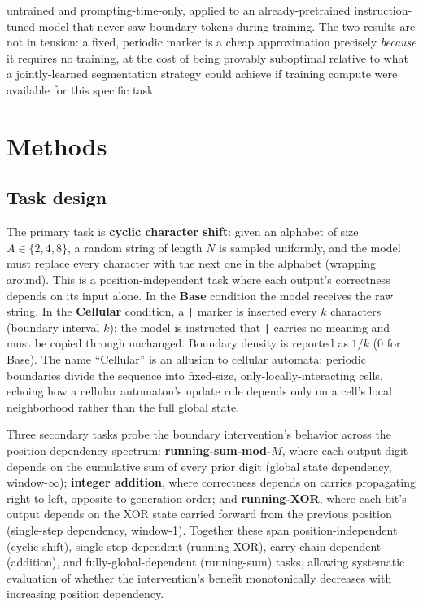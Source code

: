 \documentclass[11pt]{article}
\begin{document}
untrained and prompting-time-only, applied to an already-pretrained instruction-tuned model that never saw boundary tokens during training. The two results are not in tension: a fixed, periodic marker is a cheap approximation precisely \emph{because} it requires no training, at the cost of being provably suboptimal relative to what a jointly-learned segmentation strategy could achieve if training compute were available for this specific task.

\section{Methods}

\subsection{Task design}

The primary task is \textbf{cyclic character shift}: given an alphabet of size $A \in \{2, 4, 8\}$, a random string of length $N$ is sampled uniformly, and the model must replace every character with the next one in the alphabet (wrapping around). This is a position-independent task where each output's correctness depends on its input alone. In the \textbf{Base} condition the model receives the raw string. In the \textbf{Cellular} condition, a \texttt{|} marker is inserted every $k$ characters (boundary interval $k$); the model is instructed that \texttt{|} carries no meaning and must be copied through unchanged. Boundary density is reported as $1/k$ (0 for Base). The name ``Cellular'' is an allusion to cellular automata: periodic boundaries divide the sequence into fixed-size, only-locally-interacting cells, echoing how a cellular automaton's update rule depends only on a cell's local neighborhood rather than the full global state.

Three secondary tasks probe the boundary intervention's behavior across the position-dependency spectrum: \textbf{running-sum-mod-$M$}, where each output digit depends on the cumulative sum of every prior digit (global state dependency, window-$\infty$); \textbf{integer addition}, where correctness depends on carries propagating right-to-left, opposite to generation order; and \textbf{running-XOR}, where each bit's output depends on the XOR state carried forward from the previous position (single-step dependency, window-1). Together these span position-independent (cyclic shift), single-step-dependent (running-XOR), carry-chain-dependent (addition), and fully-global-dependent (running-sum) tasks, allowing systematic evaluation of whether the intervention's benefit monotonically decreases with increasing position dependency.
\end{document}
